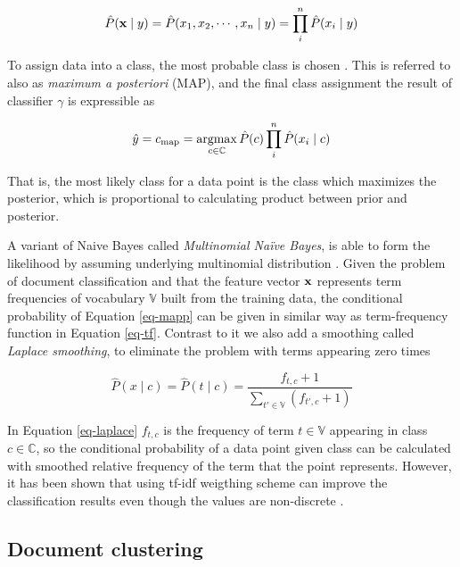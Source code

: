 \begin{equation}
    \hat{P}(\mathbf{x} \mid y) = \hat{P}(x_1, x_2, \cdots, x_n \mid y) = \prod \limits_i^n \hat{P}(x_i \mid y)
\end{equation}

To assign data into a class, the most probable class is chosen \cite{Zhang04theoptimality, acemNBtc2001, Manning:2008:IIR:1394399}. This is referred to also as \emph{maximum a posteriori} (MAP), and the final class assignment \ie the result of classifier $\gamma$ is expressible as

\begin{equation} \label{eq-mapp}
    \hat{y} = c_{\text{map}} = \operatorname*{argmax} \limits_{c \in \mathbb{C}} \hat{P}(c) \prod \limits_i^n \hat{P}(x_i \mid c)
\end{equation}

\noindent
That is, the most likely class for a data point is the class which maximizes the posterior, which is proportional to calculating product between prior and posterior.  

A variant of Naive Bayes called \emph{Multinomial Naïve Bayes}, is able to form the likelihood by assuming underlying multinomial distribution \cite{acemNBtc2001}. Given the problem of document classification and that the feature vector $\mathbf{x}$ represents term frequencies of vocabulary $\mathbb{V}$ built from the training data, the conditional probability of Equation \ref{eq-mapp} can be given in similar way as term-frequency function in Equation \ref{eq-tf}. Contrast to it we also add a smoothing called \emph{Laplace smoothing}, to eliminate the problem with terms appearing zero times \cite{Manning:2008:IIR:1394399}

\begin{equation} \label{eq-laplace}
    \hat{P}(x \mid c) = \hat{P}(t \mid c) = \dfrac{f_{t, c} + 1}{\sum \limits_{t' \in \mathbb{V}} (f_{t', c} + 1)} 
\end{equation}

\noindent
In Equation \ref{eq-laplace} $f_{t, c}$ is the frequency of term $t \in \mathbb{V}$ appearing in class $c \in \mathbb{C}$, so the conditional probability of a data point given class can be calculated with smoothed relative frequency of the term that the point represents. However, it has been shown that using tf-idf weigthing scheme can improve the classification results even though the values are non-discrete \cite{Kibriya:2004:MNB:2146834.2146882}.


\subsection{Document clustering}

